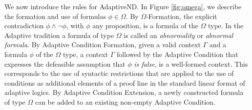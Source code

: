 \documentclass[]{article}
\begin{document}



We now introduce the rules for {\sf AdaptiveND}. In Figure \ref{fig:omega}, we describe the formation and use of formulas $\phi \in \Omega$. By $\Omega${\sf-Formation}, the explicit contradiction $\phi \wedge \neg \phi$, with $\phi$ any proposition, is a formula of the $\Omega$ type. In the Adaptive tradition a formula of type $\Omega$ is called an \textit{abnormality} or \textit{abnormal formula}. By {\sf Adaptive Condition Formation}, given a valid context $\Gamma$ and a formula $\phi$ of the $\Omega$ type, a context $\Gamma$ followed by the Adaptive Condition that expresses the defeasible assumption that $\phi$ \textit{is false}, is a well-formed context. This corresponds to the use of syntactic restrictions that are applied to the use of conditions as additional elements of a proof line in the standard linear format of adaptive logics. By {\sf Adaptive Condition Extension}, a newly constructed formula of type $\Omega$ can be added to an existing non-empty Adaptive Condition.
\end{document}
